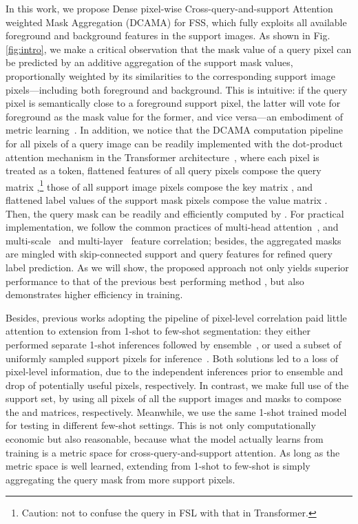 \documentclass[runningheads,table,xcdraw]{llncs}
\begin{document}
In this work, we propose Dense pixel-wise Cross-query-and-support Attention weighted Mask Aggregation (DCAMA) for FSS, which fully exploits all available foreground and background features in the support images.
As shown in Fig. \ref{fig:intro}, we make a critical observation that the mask value of a query pixel can be predicted by an additive aggregation of the support mask values, proportionally weighted by its similarities to the corresponding support image pixels---including both foreground and background.
This is intuitive: if the query pixel is semantically close to a foreground support pixel, the latter will vote for foreground as the mask value for the former, and vice versa---an embodiment of metric learning~\cite{kulis2013metric}.
In addition, we notice that the DCAMA computation pipeline for all pixels of a query image can be readily implemented with the dot-product attention mechanism in the Transformer architecture~\cite{vaswani2017attention}, where each pixel is treated as a token, flattened features of all query pixels compose the query matrix ,\footnote{Caution: not to confuse the query in FSL with that in Transformer.} those of all support image pixels compose the key matrix , and flattened label values of the support mask pixels compose the value matrix .
Then, the query mask can be readily and efficiently computed by .
For practical implementation, we follow the common practices of multi-head attention~\cite{vaswani2017attention}, and multi-scale~\cite{lin2017feature} and multi-layer~\cite{min2021hypercorrelation} feature correlation;
{\color{purple}besides, the aggregated masks are mingled with skip-connected support and query features for refined query label prediction.}
As we will show, the proposed approach not only yields superior performance to that of the previous best performing method \cite{min2021hypercorrelation}, but also demonstrates higher efficiency in training.

Besides, previous works adopting the pipeline of pixel-level correlation paid little attention to extension from 1-shot to few-shot segmentation: they either performed separate 1-shot inferences followed by ensemble~\cite{min2021hypercorrelation},
or used a subset of uniformly sampled support pixels for inference~\cite{zhang2021few}.
Both solutions led to a loss of pixel-level information, due to the independent inferences prior to ensemble and drop of potentially useful pixels, respectively.
In contrast, we make full use of the support set, by using all pixels of all the support images and masks to compose the  and  matrices, respectively.
Meanwhile, we use the same 1-shot trained model for testing in different few-shot settings.
This is not only computationally economic but also reasonable, because what the model actually learns from training is a metric space for cross-query-and-support attention.
As long as the metric space is well learned, extending from 1-shot to few-shot is simply aggregating the query mask from more support pixels.
\end{document}
